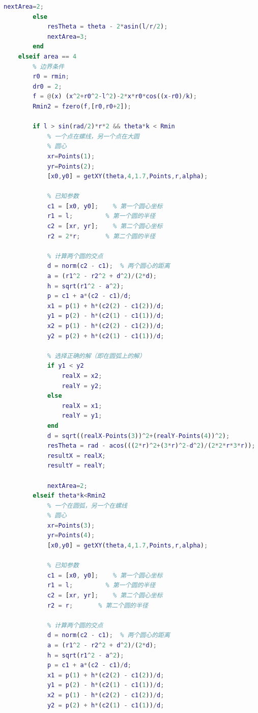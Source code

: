 \documentclass[withoutpreface,bwprint]{cumcmthesis} %
\begin{document}
\begin{appendices}
\begin{lstlisting}[language=matlab]
            nextArea=2;
        else
            resTheta = theta - 2*asin(l/r/2);
            nextArea=3;
        end
    elseif area == 4
        % 边界条件
        r0 = rmin;
        dr0 = 2;
        f = @(x) (x^2+r0^2-l^2)-2*x*r0*cos((x-r0)/k);
        Rmin2 = fzero(f,[r0,r0+2]);
    
        if l > sin(rad/2)*r*2 && theta*k < Rmin
            % 一个点在螺线，另一个点在大圆
            % 圆心
            xr=Points(1);
            yr=Points(2);
            [x0,y0] = getXY(theta,4,1.7,Points,r,alpha);
            
            % 已知参数
            c1 = [x0, y0];    % 第一个圆心坐标
            r1 = l;         % 第一个圆的半径
            c2 = [xr, yr];    % 第二个圆心坐标
            r2 = 2*r;       % 第二个圆的半径

            % 计算两个圆的交点
            d = norm(c2 - c1);  % 两个圆心的距离
            a = (r1^2 - r2^2 + d^2)/(2*d);
            h = sqrt(r1^2 - a^2);
            p = c1 + a*(c2 - c1)/d;
            x1 = p(1) + h*(c2(2) - c1(2))/d;
            y1 = p(2) - h*(c2(1) - c1(1))/d;
            x2 = p(1) - h*(c2(2) - c1(2))/d;
            y2 = p(2) + h*(c2(1) - c1(1))/d;

            % 选择正确的解（即在圆弧上的解）
            if y1 < y2
                realX = x2;
                realY = y2;
            else
                realX = x1;
                realY = y1;
            end
            d = sqrt((realX-Points(3))^2+(realY-Points(4))^2);
            resTheta = rad - acos(((2*r)^2+(3*r)^2-d^2)/(2*2*r*3*r));
            resultX = realX;
            resultY = realY;
            
            nextArea=2;
        elseif theta*k<Rmin2
            % 一个在圆弧，另一个在螺线
            % 圆心
            xr=Points(3);
            yr=Points(4);
            [x0,y0] = getXY(theta,4,1.7,Points,r,alpha);
            
            % 已知参数
            c1 = [x0, y0];    % 第一个圆心坐标
            r1 = l;         % 第一个圆的半径
            c2 = [xr, yr];    % 第二个圆心坐标
            r2 = r;       % 第二个圆的半径

            % 计算两个圆的交点
            d = norm(c2 - c1);  % 两个圆心的距离
            a = (r1^2 - r2^2 + d^2)/(2*d);
            h = sqrt(r1^2 - a^2);
            p = c1 + a*(c2 - c1)/d;
            x1 = p(1) + h*(c2(2) - c1(2))/d;
            y1 = p(2) - h*(c2(1) - c1(1))/d;
            x2 = p(1) - h*(c2(2) - c1(2))/d;
            y2 = p(2) + h*(c2(1) - c1(1))/d;


\end{lstlisting}
\end{appendices}
\end{document}
